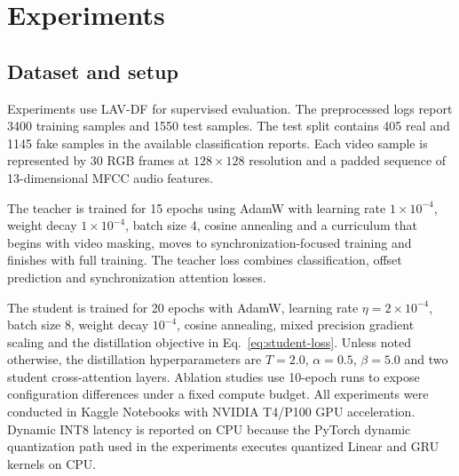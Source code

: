 \documentclass[pdflatex,sn-basic,Numbered]{sn-jnl}
\begin{document}
\section{Experiments}\label{sec:experiments}

\subsection{Dataset and setup}\label{subsec:setup}

Experiments use LAV-DF \cite{cai2022lavdf} for supervised evaluation. The preprocessed logs report 3400 training samples and 1550 test samples. The test split contains 405 real and 1145 fake samples in the available classification reports. Each video sample is represented by 30 RGB frames at $128 \times 128$ resolution and a padded sequence of 13-dimensional MFCC audio features.

The teacher is trained for 15 epochs using AdamW with learning rate $1 \times 10^{-4}$, weight decay $1 \times 10^{-4}$, batch size 4, cosine annealing and a curriculum that begins with video masking, moves to synchronization-focused training and finishes with full training. The teacher loss combines classification, offset prediction and synchronization attention losses.

The student is trained for 20 epochs with AdamW, learning rate $\eta=2 \times 10^{-4}$, batch size 8, weight decay $10^{-4}$, cosine annealing, mixed precision gradient scaling and the distillation objective in Eq.~\eqref{eq:student-loss}. Unless noted otherwise, the distillation hyperparameters are $T=2.0$, $\alpha=0.5$, $\beta=5.0$ and two student cross-attention layers. Ablation studies use 10-epoch runs to expose configuration differences under a fixed compute budget. All experiments were conducted in Kaggle Notebooks with NVIDIA T4/P100 GPU acceleration. Dynamic INT8 latency is reported on CPU because the PyTorch dynamic quantization path used in the experiments executes quantized Linear and GRU kernels on CPU.
\end{document}
